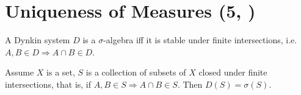 \section{Uniqueness of Measures \tiny{(5, \cite{schilling2017measures})}}

\begin{lemma}   \label{lem:Dynkin}
    A Dynkin system \(D\) is a \(\sigma\)-algebra iff it is stable under finite intersections, i.e. \(A,B \in D \Rightarrow A \cap B \in D\).
\end{lemma}
\begin{theorem}[Dynkin] \label{theorem:Dynkin}
    Assume \(X\) is a set, \(S\) is a collection of subsets of \(X\) closed under finite intersections, that is, if 
    \(A, B \in S \Rightarrow A \cap B \in S\). Then \(D(S) = \sigma(S)\).
\end{theorem}
\ifdetailed
